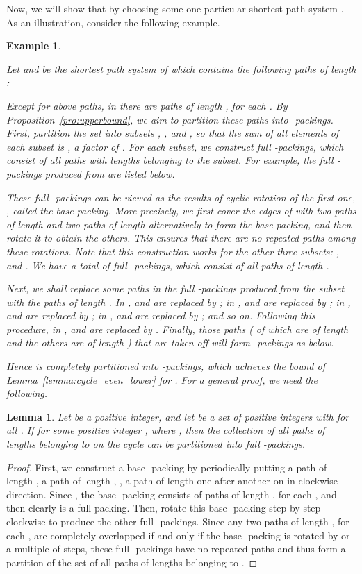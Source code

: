 \documentclass[journal,draftcls,onecolumn,12pt,twoside]{IEEEtran}
\newtheorem{lemma}[theorem]{\bf Lemma}
\newtheorem{example}{Example}
\begin{document}
Now, we will show that  by choosing some one particular shortest path system .
As an illustration, consider the following example.

\begin{example}\label{exa:20}
{\rm
Let  and  be the shortest path system of  which contains the following  paths of length :

Except for above  paths, in  there are  paths of length , for each .
By Proposition~\ref{pro:upperbound}, we aim to partition these  paths into  -packings.
First, partition the set  into subsets , ,  and , so that the sum of all elements of each subset is , a factor of .
For each subset, we construct  full -packings, which consist of all paths with lengths belonging to the subset.
For example, the  full -packings produced from  are listed below.


\noindent
These  full -packings can be viewed as the results of cyclic rotation of the first one, , called the \emph{base packing}.
More precisely, we first cover the edges of  with two paths of length  and two paths of length  alternatively to form the base packing, and then rotate it to obtain the others.
This ensures that there are no repeated paths among these rotations.
Note that this construction works for the other three subsets: ,  and .
We have a total of  full -packings, which consist of all paths of length .

Next, we shall replace some paths in the full -packings produced from the subset  with the paths of length .
In ,  and  are replaced by ; in ,  and  are replaced by ; in ,  and  are replaced by ; in ,  and  are replaced by ; and so on.
Following this procedure, in ,  and  are replaced by .
Finally, those  paths ( of which are of length  and the others are of length ) that are taken off will form  -packings as below.


\noindent
Hence  is completely partitioned into  -packings, which achieves the bound of Lemma~\ref{lemma:cycle_even_lower} for .
For a general proof, we need the following.
}
\end{example}

\begin{lemma}\label{lemma:partition}
Let  be a positive integer, and let  be a set of positive integers with  for all .
If  for some positive integer , where , then the collection of all paths of lengths belonging to  on the cycle  can be partitioned into  full -packings.
\end{lemma}
\begin{proof}
First, we construct a base -packing by periodically putting a path of length , a path of length , , a path of length  one after another on  in clockwise direction.
Since , the base -packing consists of  paths of length , for each , and then clearly is a full packing.
Then, rotate this base -packing step by step clockwise to produce the other  full -packings.
Since any two paths of length , for each , are completely overlapped if and only if the base -packing is rotated by  or a multiple of  steps, these  full -packings have no repeated paths and thus form a partition of the set of all paths of lengths belonging to .
\end{proof}
\end{document}
